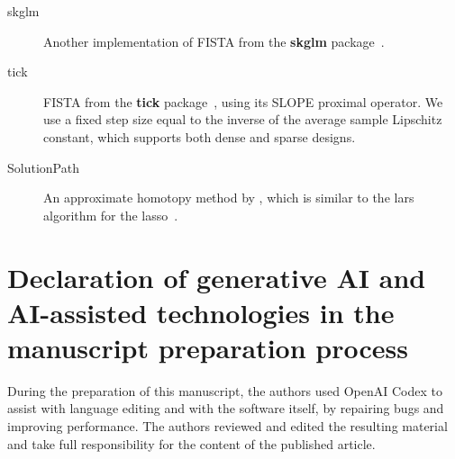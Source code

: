 \documentclass[a4paper,fleqn]{cas-sc}
\begin{document}
\begin{description}
  \item[skglm] Another implementation of FISTA from the \textbf{skglm}
        package~\citep{bertrand2022}.

  \item[tick] FISTA from the \textbf{tick} package~\citep{bacry2018}, using its
        SLOPE proximal operator. We use a fixed step size equal to the inverse
        of the average sample Lipschitz constant, which supports both dense and
        sparse designs.

  \item[SolutionPath] An approximate homotopy method by \citet{dupuis2024},
        which is similar to the lars algorithm for the lasso~\citep{efron2004}.
\end{description}

\printcredits

\section*{
  Declaration of generative AI and AI-assisted technologies in the manuscript
  preparation process
}

During the preparation of this manuscript, the authors used OpenAI Codex to
assist with language editing and with the software itself, by repairing bugs and
improving performance. The authors reviewed and edited the resulting material
and take full responsibility for the content of the published article.




\clearpage
\addtocounter{page}{-1}
\end{document}
